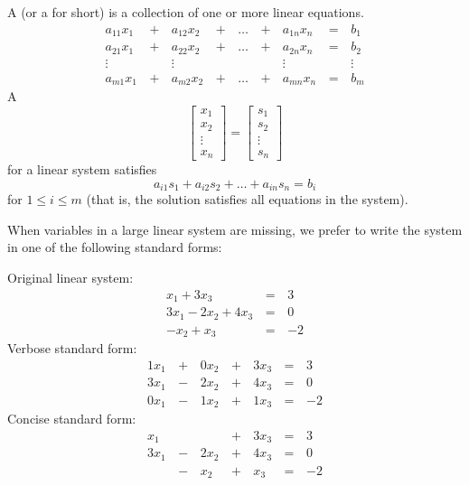 \begin{applicationActivities}{1}{3}
\begin{definition}
A  (or a  for short)
is a collection of one or more linear equations.
  \begin{alignat*}{5}
    a_{11}x_1 &\,+\,& a_{12}x_2 &\,+\,& \dots  &\,+\,& a_{1n}x_n &\,=\,& b_1 \\
    a_{21}x_1 &\,+\,& a_{22}x_2 &\,+\,& \dots  &\,+\,& a_{2n}x_n &\,=\,& b_2 \\
     \vdots&  &\vdots&   &&  &\vdots&&\vdots  \\
    a_{m1}x_1 &\,+\,& a_{m2}x_2 &\,+\,& \dots  &\,+\,& a_{mn}x_n &\,=\,& b_m
  \end{alignat*}
A 
\[
  \begin{bmatrix}
    x_1 \\
    x_2 \\
    \vdots \\
    x_n
  \end{bmatrix}=
  \begin{bmatrix}
    s_1 \\
    s_2 \\
    \vdots \\
    s_n
  \end{bmatrix}
\]
for a linear system satisfies
\[
a_{i1}s_1+a_{i2}s_2+\dots+a_{in}s_n=b_i
\]
for \(1\leq i\leq m\) (that is, the solution satisfies all equations
in the system).
\end{definition}

\begin{remark}
  When variables in a large linear system are missing, we prefer to
  write the system in one of the following standard forms:

  \begin{multicols}{3}\noindent
    Original linear system:
    \begin{alignat*}{2}
       x_1 + 3x_3 &\,=\,& 3 \\
      3x_1 - 2x_2 + 4x_3 &\,=\,& 0 \\
      -x_2 +  x_3 &\,=\,& -2
    \end{alignat*}
    Verbose standard form:
    \begin{alignat*}{4}
      1x_1 &\,+\,& 0x_2 &\,+\,& 3x_3 &\,=\,& 3 \\
      3x_1 &\,-\,& 2x_2 &\,+\,& 4x_3 &\,=\,& 0 \\
      0x_1 &\,-\,& 1x_2 &\,+\,& 1x_3 &\,=\,& -2
    \end{alignat*}
    Concise standard form:
    \begin{alignat*}{4}
       x_1 &     &      &\,+\,& 3x_3 &\,=\,& 3 \\
      3x_1 &\,-\,& 2x_2 &\,+\,& 4x_3 &\,=\,& 0 \\
           &\,-\,&  x_2 &\,+\,&  x_3 &\,=\,& -2
    \end{alignat*}
  \end{multicols}
\end{remark}


\end{applicationActivities}
